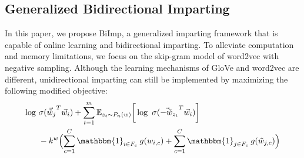 \documentclass[11pt,a4paper]{article}
\newcommand{\indicator}{\ensuremath{\mathbbm{1}}}
\def\proposedmethod{BiImp}
\begin{document}

\subsection{Generalized Bidirectional Imparting }
\label{sec:gen_imparting}

In this paper, we propose \proposedmethod{}, a generalized imparting framework that is capable of online learning and bidirectional imparting. To alleviate computation and memory limitations, we focus on the skip-gram model of word2vec with negative sampling.
Although the learning mechanisms of GloVe and word2vec are
different, unidirectional imparting can still be implemented
by maximizing the following modified objective:
\begin{align}
\begin{split}
\log ~ & \sigma ({\vec{\tilde{w}}_{j}}^T \vec{w}_{i}) + \sum_{t = 1}^{m} {\mathbb{E}}_{z_t \sim P_n(w)} \bigg[ \log ~ \sigma({\vec{-\tilde{w}}_{z_t}}^T \vec{w}_{i}) \bigg] \\ 
& -k^w \Bigl(  \sum_{c=1}^{C} \indicator_{i\in{}F_c} \: g(w_{i,c}) + \sum_{c=1}^{C} \indicator_{j \in F_c} \: g(\tilde{w}_{j,c}) \Bigr)
\end{split}
\label{eq:word2vec_uni}
\end{align}
\end{document}
